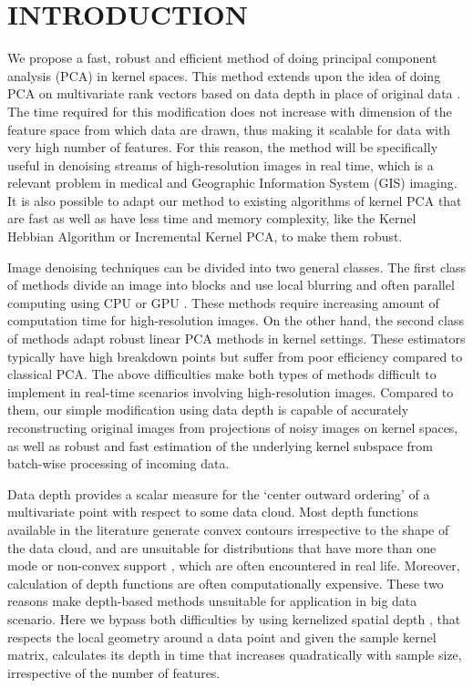 \documentclass[10pt, conference, compsocconf]{IEEEtran}
\begin{document}
\section{INTRODUCTION}

We propose a fast, robust and efficient method of doing principal component analysis (PCA) in kernel spaces. This method extends upon the idea of doing PCA on multivariate rank vectors based on data depth in place of original data \cite{Majumdar15}. The time required for this modification does not increase with dimension of the feature space from which data are drawn, thus making it scalable for data with very high number of features. For this reason, the method will be specifically useful in denoising streams of high-resolution images in real time, which is a relevant problem in medical\cite{Ouahabi13} and Geographic Information System (GIS) imaging\cite{YeMohamadian}. It is also possible to adapt our method to existing algorithms of kernel PCA that are fast as well as have less time and memory complexity, like the Kernel Hebbian Algorithm\cite{KimFranzSchol05} or Incremental Kernel PCA\cite{OzawaTakeuchiAbe10}, to make them robust.

Image denoising techniques can be divided into two general classes. The first class of methods divide an image into blocks and use local blurring and often parallel computing using CPU or GPU \cite{nvidia}. These methods require increasing amount of computation time for high-resolution images. On the other hand, the second class of methods adapt robust linear PCA methods in kernel settings. These estimators typically have high breakdown points but suffer from poor efficiency compared to classical PCA\cite{taskinen12, hubert05}. The above difficulties make both types of methods difficult to implement in real-time scenarios involving high-resolution images. Compared to them, our simple modification using data depth is capable of accurately reconstructing original images from projections of noisy images on kernel spaces, as well as robust and fast estimation of the underlying kernel subspace from batch-wise processing of incoming data.

Data depth provides a scalar measure for the `center outward ordering' of a multivariate point with respect to some data cloud\cite{zuo00}. Most depth functions available in the literature generate convex contours irrespective to the shape of the data cloud, and are unsuitable for distributions that have more than one mode or non-convex support \cite{Paindaveine13}, which are often encountered in real life. Moreover, calculation of depth functions are often computationally expensive. These two reasons make depth-based methods unsuitable for application in big data scenario. Here we bypass both difficulties by using kernelized spatial depth \cite{Chen09}, that respects the local geometry around a data point and given the sample kernel matrix, calculates its depth in time that increases quadratically with sample size, irrespective of the number of features.
\end{document}
